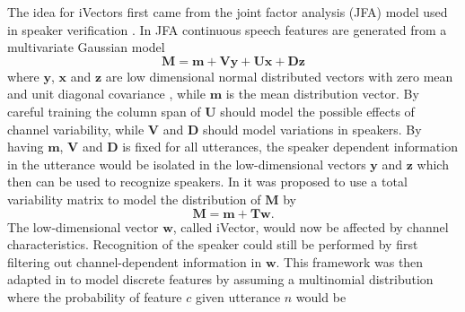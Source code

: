 The idea for iVectors first came from the joint factor analysis (JFA) model used in speaker verification \cite{dehak2011front}. In JFA continuous speech features are generated from a multivariate Gaussian model
\begin{equation}
\label{jfa}
\mathbf{M}=\mathbf{m}+\mathbf{Vy}+\mathbf{Ux}+\mathbf{Dz}
\end{equation}
where $\mathbf{y}$, $\mathbf{x}$ and $\mathbf{z}$ are low dimensional normal distributed vectors with zero mean and unit diagonal covariance \cite{dehak2011front}, while $\mathbf{m}$ is the mean distribution vector. By careful training the column span of $\mathbf{U}$ should model the possible effects of channel variability, while $\mathbf{V}$ and $\mathbf{D}$ should model variations in speakers. By having $\mathbf{m}$, $\mathbf{V}$ and $\mathbf{D}$ is fixed for all utterances, the speaker dependent information in the utterance would be isolated in the low-dimensional vectors $\mathbf{y}$ and $\mathbf{z}$ which then can be used to recognize speakers. In \cite{dehak2011front} it was proposed to use a total variability matrix to model the distribution of $\mathbf{M}$ by
\begin{equation}
\label{ffa}
\mathbf{M}=\mathbf{m}+\mathbf{Tw}.
\end{equation}
The low-dimensional vector $\mathbf{w}$, called iVector, would now be affected by channel characteristics. Recognition of the speaker could still be performed by first filtering out channel-dependent information in $\mathbf{w}$. This framework was then adapted in \cite{srivector} to model discrete features by assuming a multinomial distribution where the probability of feature $c$ given utterance $n$ would be 
